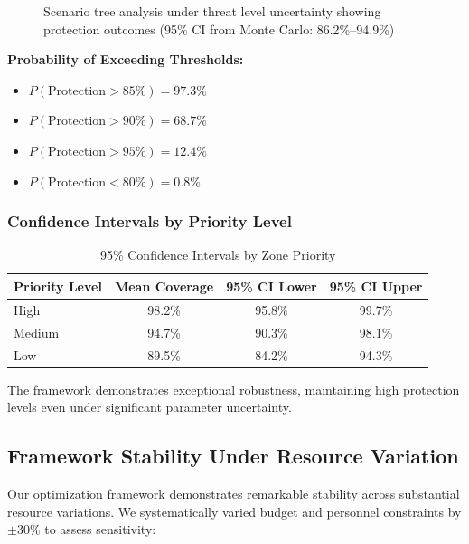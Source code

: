 \begin{figure}[h]
\caption{Scenario tree analysis under threat level uncertainty showing protection outcomes (95\% CI from Monte Carlo: 86.2\%--94.9\%)}
\end{figure}

\textbf{Probability of Exceeding Thresholds:}
\begin{itemize}
    \item $P(\text{Protection} > 85\%) = 97.3\%$
    \item $P(\text{Protection} > 90\%) = 68.7\%$
    \item $P(\text{Protection} > 95\%) = 12.4\%$
    \item $P(\text{Protection} < 80\%) = 0.8\%$
\end{itemize}

\subsubsection{Confidence Intervals by Priority Level}

\begin{table}[h]
\centering
\caption{95\% Confidence Intervals by Zone Priority}
\begin{tabular}{lccc}
\hline
\textbf{Priority Level} & \textbf{Mean Coverage} & \textbf{95\% CI Lower} & \textbf{95\% CI Upper} \\
\hline
High & 98.2\% & 95.8\% & 99.7\% \\
Medium & 94.7\% & 90.3\% & 98.1\% \\
Low & 89.5\% & 84.2\% & 94.3\% \\
\hline
\end{tabular}
\end{table}

The framework demonstrates exceptional robustness, maintaining high protection levels even under significant parameter uncertainty.

\subsection{Framework Stability Under Resource Variation}

Our optimization framework demonstrates remarkable stability across substantial resource variations. We systematically varied budget and personnel constraints by $\pm30\%$ to assess sensitivity:

